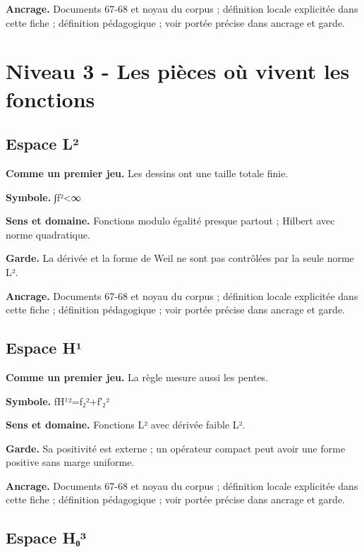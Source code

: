 \documentclass[
  9pt,
  a4paper,
]{article}
\begin{document}
\textbf{Ancrage.} Documents 67-68 et noyau du corpus ; définition locale
explicitée dans cette fiche ; définition pédagogique ; voir portée
précise dans ancrage et garde.

\hypertarget{niveau-3---les-piuxe8ces-ouxf9-vivent-les-fonctions}{%
\section{Niveau 3 - Les pièces où vivent les
fonctions}\label{niveau-3---les-piuxe8ces-ouxf9-vivent-les-fonctions}}

\hypertarget{espace-luxb2}{%
\subsection{Espace L²}\label{espace-luxb2}}

\textbf{Comme un premier jeu.} Les dessins ont une taille totale finie.

\textbf{Symbole.} ∫\textbar f\textbar²\textless∞

\textbf{Sens et domaine.} Fonctions modulo égalité presque partout ;
Hilbert avec norme quadratique.

\textbf{Garde.} La dérivée et la forme de Weil ne sont pas contrôlées
par la seule norme L².

\textbf{Ancrage.} Documents 67-68 et noyau du corpus ; définition locale
explicitée dans cette fiche ; définition pédagogique ; voir portée
précise dans ancrage et garde.

\hypertarget{espace-huxb9}{%
\subsection{Espace H¹}\label{espace-huxb9}}

\textbf{Comme un premier jeu.} La règle mesure aussi les pentes.

\textbf{Symbole.}
\textbar\textbar f\textbar\textbar H¹²=\textbar\textbar f\textbar\textbar₂²+\textbar\textbar f′\textbar\textbar₂²

\textbf{Sens et domaine.} Fonctions L² avec dérivée faible L².

\textbf{Garde.} Sa positivité est externe ; un opérateur compact peut
avoir une forme positive sans marge uniforme.

\textbf{Ancrage.} Documents 67-68 et noyau du corpus ; définition locale
explicitée dans cette fiche ; définition pédagogique ; voir portée
précise dans ancrage et garde.

\hypertarget{espace-hux2080uxb3}{%
\subsection{Espace H₀³}\label{espace-hux2080uxb3}}
\end{document}
